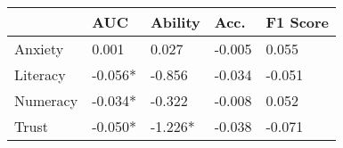\begin{tabular}{lllll}
\toprule
 & AUC & Ability & Acc. & F1 Score \\
\midrule
Anxiety & 0.001 & 0.027 & -0.005 & 0.055 \\
Literacy & -0.056* & -0.856 & -0.034 & -0.051 \\
Numeracy & -0.034* & -0.322 & -0.008 & 0.052 \\
Trust & -0.050* & -1.226* & -0.038 & -0.071 \\
\bottomrule
\end{tabular}

